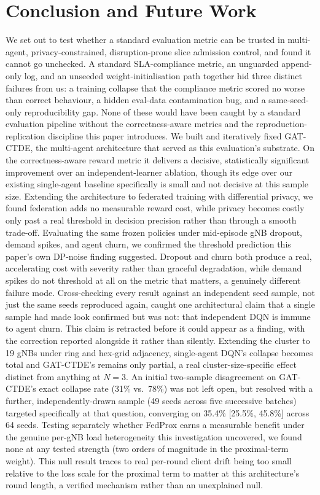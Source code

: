 \documentclass[journal]{IEEEtran}
\begin{document}
\section{Conclusion and Future Work}
\label{sec:conclusion}
We set out to test whether a standard evaluation metric can be trusted
in multi-agent, privacy-constrained, disruption-prone slice admission
control, and found it cannot go unchecked. A standard SLA-compliance
metric, an unguarded append-only log, and an unseeded
weight-initialisation path together hid three distinct failures from
us: a training collapse that the compliance metric scored no worse
than correct behaviour, a hidden eval-data contamination bug, and a
same-seed-only reproducibility gap. None of these would have been
caught by a standard evaluation pipeline without the correctness-aware
metrics and the reproduction-replication discipline this paper
introduces. We built and iteratively fixed GAT-CTDE, the multi-agent
architecture that served as this evaluation's substrate. On the
correctness-aware reward metric it delivers a decisive, statistically
significant improvement over an independent-learner ablation, though
its edge over our existing single-agent baseline specifically is small
and not decisive at this sample size. Extending the architecture to
federated training with differential privacy, we found federation
adds no measurable reward cost, while privacy becomes costly only past
a real threshold in decision precision rather than through a smooth
trade-off. Evaluating the same frozen policies under mid-episode gNB
dropout, demand spikes, and agent churn, we confirmed the threshold
prediction this paper's own DP-noise finding suggested. Dropout and
churn both produce a real, accelerating cost with severity rather than
graceful degradation, while demand spikes do not threshold at all on
the metric that matters, a genuinely different failure mode.
Cross-checking every result against an independent seed sample, not
just the same seeds reproduced again, caught one architectural claim
that a single sample had made look confirmed but was not: that
independent DQN is immune to agent churn. This claim is retracted
before it could appear as a finding, with the correction reported
alongside it rather than silently. Extending the cluster to 19 gNBs
under ring and hex-grid adjacency, single-agent DQN's collapse becomes
total and GAT-CTDE's remains only partial, a real cluster-size-specific
effect distinct from anything at $N=3$. An initial two-sample
disagreement on GAT-CTDE's exact collapse rate (31\% vs.\ 78\%) was
not left open, but resolved with a further, independently-drawn sample
(49 seeds across five successive batches) targeted specifically at
that question, converging on 35.4\% [25.5\%, 45.8\%] across 64 seeds.
Testing separately whether FedProx earns a measurable benefit under
the genuine per-gNB load heterogeneity this investigation uncovered,
we found none at any tested strength (two orders of magnitude in the
proximal-term weight). This null result traces to real per-round
client drift being too small relative to the loss scale for the
proximal term to matter at this architecture's round length, a
verified mechanism rather than an unexplained null.
\end{document}
